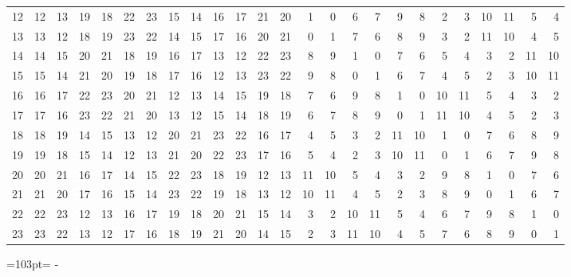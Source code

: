 \documentclass[10pt,a4paper]{article}
\newcommand{\needspace}[1]{\par\penalty-100\begingroup\dimen0=#1\relax\dimen2=\pagegoal
  \advance\dimen2-\pagetotal\ifdim\dimen0>\dimen2\relax\ifdim\dimen2>0pt\vfil\break\fi\fi
  \endgroup}
\numberwithin{equation}{section}
\begin{document}
{\begin{longtable}{@{}r|rrrrrrrrrrrrrrrrrrrrrrrr@{}}
12 & 12 & 13 & 19 & 18 & 22 & 23 & 15 & 14 & 16 & 17 & 21 & 20 & 1 & 0 & 6 & 7 & 9 & 8 & 2 & 3 & 10 & 11 & 5 & 4\\
13 & 13 & 12 & 18 & 19 & 23 & 22 & 14 & 15 & 17 & 16 & 20 & 21 & 0 & 1 & 7 & 6 & 8 & 9 & 3 & 2 & 11 & 10 & 4 & 5\\
14 & 14 & 15 & 20 & 21 & 18 & 19 & 16 & 17 & 13 & 12 & 22 & 23 & 8 & 9 & 1 & 0 & 7 & 6 & 5 & 4 & 3 & 2 & 11 & 10\\
15 & 15 & 14 & 21 & 20 & 19 & 18 & 17 & 16 & 12 & 13 & 23 & 22 & 9 & 8 & 0 & 1 & 6 & 7 & 4 & 5 & 2 & 3 & 10 & 11\\
16 & 16 & 17 & 22 & 23 & 20 & 21 & 12 & 13 & 14 & 15 & 19 & 18 & 7 & 6 & 9 & 8 & 1 & 0 & 10 & 11 & 5 & 4 & 3 & 2\\
17 & 17 & 16 & 23 & 22 & 21 & 20 & 13 & 12 & 15 & 14 & 18 & 19 & 6 & 7 & 8 & 9 & 0 & 1 & 11 & 10 & 4 & 5 & 2 & 3\\
18 & 18 & 19 & 14 & 15 & 13 & 12 & 20 & 21 & 23 & 22 & 16 & 17 & 4 & 5 & 3 & 2 & 11 & 10 & 1 & 0 & 7 & 6 & 8 & 9\\
19 & 19 & 18 & 15 & 14 & 12 & 13 & 21 & 20 & 22 & 23 & 17 & 16 & 5 & 4 & 2 & 3 & 10 & 11 & 0 & 1 & 6 & 7 & 9 & 8\\
20 & 20 & 21 & 16 & 17 & 14 & 15 & 22 & 23 & 18 & 19 & 12 & 13 & 11 & 10 & 5 & 4 & 3 & 2 & 9 & 8 & 1 & 0 & 7 & 6\\
21 & 21 & 20 & 17 & 16 & 15 & 14 & 23 & 22 & 19 & 18 & 13 & 12 & 10 & 11 & 4 & 5 & 2 & 3 & 8 & 9 & 0 & 1 & 6 & 7\\
22 & 22 & 23 & 12 & 13 & 16 & 17 & 19 & 18 & 20 & 21 & 15 & 14 & 3 & 2 & 10 & 11 & 5 & 4 & 6 & 7 & 9 & 8 & 1 & 0\\*
23 & 23 & 22 & 13 & 12 & 17 & 16 & 18 & 19 & 21 & 20 & 14 & 15 & 2 & 3 & 11 & 10 & 4 & 5 & 7 & 6 & 8 & 9 & 0 & 1\\
\bottomrule\end{longtable}}
\needspace{103pt}
\end{document}
